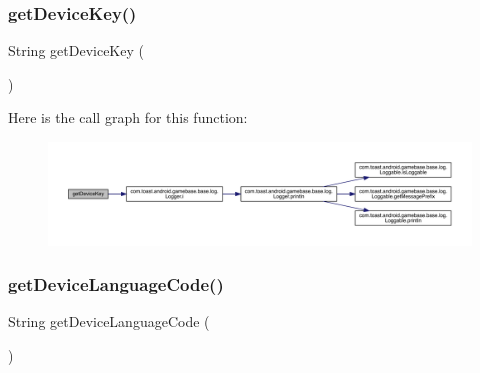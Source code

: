 \subsubsection{\texorpdfstring{get\+Device\+Key()}{getDeviceKey()}}
{\footnotesize\ttfamily String get\+Device\+Key (\begin{DoxyParamCaption}{ }\end{DoxyParamCaption})}

Here is the call graph for this function\+:
\nopagebreak
\begin{figure}[H]
\begin{center}
\leavevmode
\includegraphics[width=350pt]{classcom_1_1toast_1_1android_1_1gamebase_1_1_gamebase_system_info_a946aee63d952b390e1d4a96fa3e34407_cgraph}
\end{center}
\end{figure}
\mbox{\label{classcom_1_1toast_1_1android_1_1gamebase_1_1_gamebase_system_info_aed5b07dbbdea610efa77f1816196adf1}} 
\subsubsection{\texorpdfstring{get\+Device\+Language\+Code()}{getDeviceLanguageCode()}}
{\footnotesize\ttfamily String get\+Device\+Language\+Code (\begin{DoxyParamCaption}{ }\end{DoxyParamCaption})}

